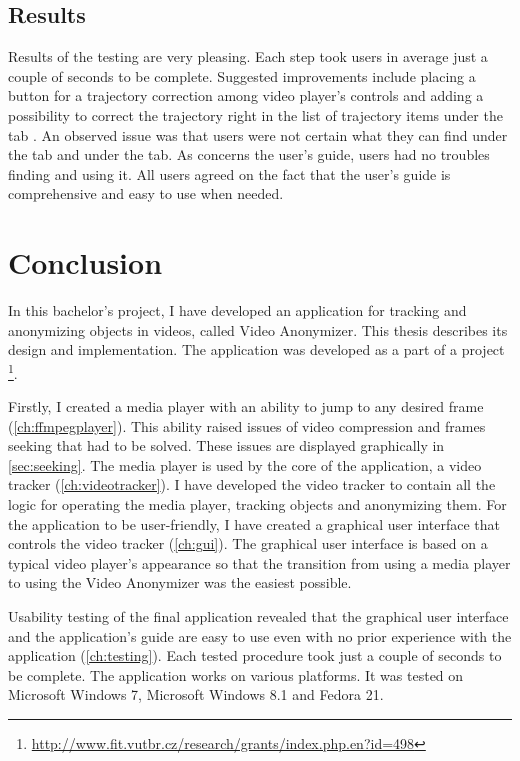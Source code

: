 \section{Results}
Results of the testing are very pleasing. Each step took users in average just a couple of seconds to be complete. Suggested improvements include placing a button for a trajectory correction among video player's controls and adding a possibility to correct the trajectory right in the list of trajectory items under the tab . An observed issue was that users were not certain what they can find under the  tab and under the  tab. As concerns the user's guide, users had no troubles finding and using it. All users agreed on the fact that the user's guide is comprehensive and easy to use when needed. 

\chapter{Conclusion}
In this bachelor's project, I have developed an application for tracking and anonymizing objects in videos, called Video Anonymizer. This thesis describes its design and implementation. The application was developed as a part of a project \footnote{\url{http://www.fit.vutbr.cz/research/grants/index.php.en?id=498}}.

Firstly, I created a media player with an ability to jump to any desired frame (\autoref{ch:ffmpegplayer}). This ability raised issues of video compression and frames seeking that had to be solved. These issues are displayed graphically in \autoref{sec:seeking}. The media player is used by the core of the application, a video tracker (\autoref{ch:videotracker}). I have developed the video tracker to contain all the logic for operating the media player, tracking objects and anonymizing them. For the application to be user-friendly, I have created a graphical user interface that controls the video tracker (\autoref{ch:gui}). The graphical user interface is based on a typical video player's appearance so that the transition from using a media player to using the Video Anonymizer was the easiest possible.

Usability testing of the final application revealed that the graphical user interface and the application's guide are easy to use even with no prior experience with the application (\autoref{ch:testing}). Each tested procedure took just a couple of seconds to be complete. The application works on various platforms. It was tested on Microsoft Windows 7, Microsoft Windows 8.1 and Fedora 21. 

